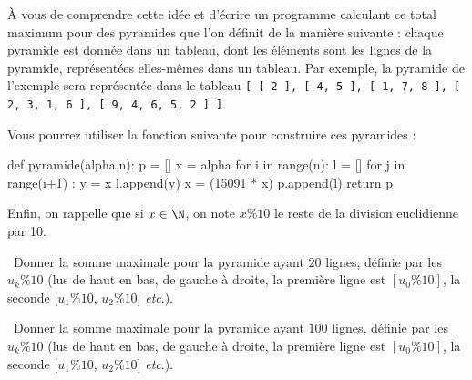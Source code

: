 À vous de comprendre cette idée et d'écrire un programme calculant ce total maximum pour 
des pyramides que l'on définit de la manière suivante : chaque pyramide est donnée dans 
un tableau, dont les éléments sont les lignes de la pyramide, représentées elles-mêmes 
dans un tableau. Par exemple, la pyramide de l'exemple sera représentée dans le tableau 
\texttt{[ [ 2 ], [ 4, 5 ], [ 1, 7, 8 ], [ 2, 3, 1, 6 ], [ 9, 4, 6, 5, 2 ] ]}. 

Vous pourrez utiliser la fonction suivante pour construire ces pyramides :
\begin{pyverbatim}
def pyramide(alpha,n):
    p = []
    x = alpha
    for i in range(n):
        l = []
        for j in range(i+1) :
            y = x %
            l.append(y)
            x = (15091 * x) %
        p.append(l)
    return p
\end{pyverbatim}

Enfin, on rappelle que si $x\in\N$, on note $x\% 10$ le reste de la division euclidienne par 10.

\question\ Donner la somme maximale pour la pyramide ayant $20$ lignes, définie par les $u_k \% 10$ (lus de haut en bas, de gauche à droite, la première ligne est $[u_0\%10]$, la seconde $[u_1\%10$, $u_2\%10]$ \emph{etc}.).

\medskip

\question\ Donner la somme maximale pour la pyramide ayant $100$ lignes, définie par les $u_k \% 10$ (lus de haut en bas, de gauche à droite, la première ligne est $[u_0\%10]$, la seconde $[u_1\%10$, $u_2\%10]$ \emph{etc}.).